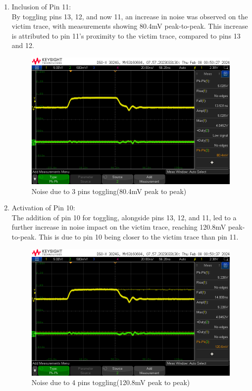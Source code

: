 \documentclass[a4paper,11pt]{article}%
\begin{document}
\begin{enumerate}
	\item Inclusion of Pin 11:\\ By toggling pins 13, 12, and now 11, an increase in noise was observed on the victim trace, with measurements showing 80.4mV peak-to-peak. This increase is attributed to pin 11's proximity to the victim trace, compared to pins 13 and 12.
	\begin{figure}[H]
		\centering
		\includegraphics[scale=0.5]{figures/noise_plane_3.png}
		\caption{Noise due to 3 pins toggling(80.4mV peak to peak)}
		\label{noise_plane_3}
	\end{figure}
	
	\item Activation of Pin 10:\\ The addition of pin 10 for toggling, alongside pins 13, 12, and 11, led to a further increase in noise impact on the victim trace, reaching 120.8mV peak-to-peak. This is due to pin 10 being closer to the victim trace than pin 11.
	\begin{figure}[H]
		\centering
		\includegraphics[scale=0.5]{figures/noise_plane_4.png}
		\caption{Noise due to 4 pins toggling(120.8mV peak to peak)}
		\label{noise_plane_4}
	\end{figure}
	

\end{enumerate}
\end{document}
